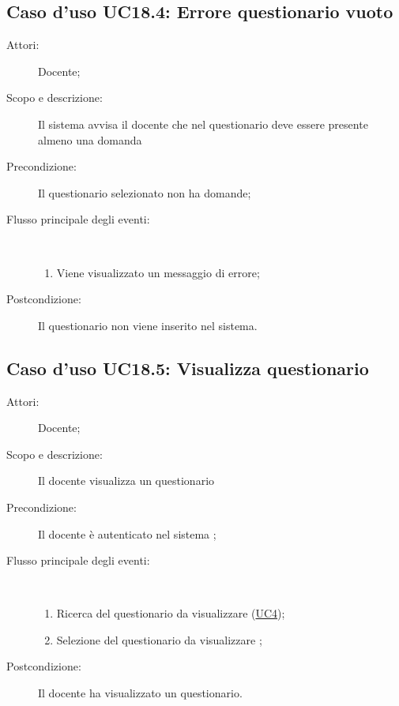 \subsection{Caso d'uso UC18.4: Errore questionario vuoto}\begin{description}
	\item[Attori:] Docente;
	\item[Scopo e descrizione:] Il sistema avvisa il docente che nel questionario deve essere presente almeno una domanda
	\item[Precondizione:] Il questionario selezionato non ha domande;
	
	\item[Flusso principale degli eventi:] \ 
	\begin{enumerate}
		\item Viene visualizzato un messaggio di errore;
		
	\end{enumerate}
	\item[Postcondizione:] Il questionario non viene inserito nel sistema.
\end{description}
\hypertarget{UC18.5}{}
\subsection{Caso d'uso UC18.5: Visualizza questionario}\begin{description}
	\item[Attori:] Docente;
	\item[Scopo e descrizione:] Il docente visualizza un questionario
	\item[Precondizione:] Il docente è autenticato nel sistema
	;
	
	\item[Flusso principale degli eventi:] \ 
	\begin{enumerate}
		\item Ricerca del questionario da visualizzare	 (\hyperlink{UC4}{UC4});
		\item Selezione del questionario da visualizzare	;
		
	\end{enumerate}
	\item[Postcondizione:] Il docente ha visualizzato un questionario.
\end{description}
\hypertarget{UC19}{}
